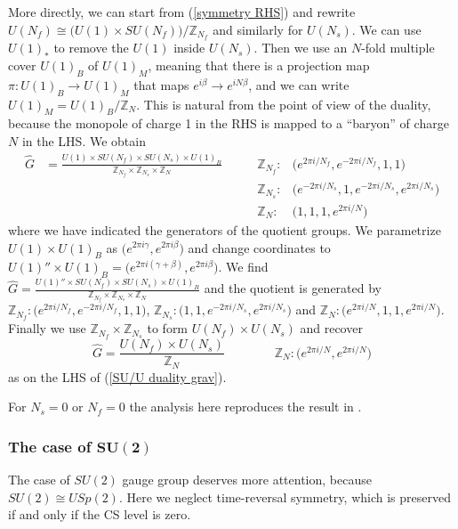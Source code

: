 \documentclass[a4paper, 12pt]{article}
\newcommand{\wh}{\widehat}
\newcommand{\matht}[1]{\ensuremath{\boldsymbol{#1}}}
\numberwithin{equation}{section}
\newcommand{\be}{\begin{equation}} \newcommand{\ee}{\end{equation}}
\newcommand{\bea}{\begin{equation} \begin{aligned}} \newcommand{\eea}{\end{aligned} \end{equation}}
\newcommand{\bZ}{\mathbb{Z}}
\begin{document}
More directly, we can start from (\ref{symmetry RHS}) and rewrite $U(N_f) \cong \big( U(1) \times SU(N_f) \big)/\bZ_{N_f}$ and similarly for $U(N_s)$. We can use $U(1)_*$ to remove the $U(1)$ inside $U(N_s)$. Then we use an $N$-fold multiple cover $U(1)_B$ of $U(1)_M$, meaning that there is a projection map $\pi:U(1)_B \to U(1)_M$ that maps $e^{i\beta} \to e^{iN\beta}$, and we can write $U(1)_M = U(1)_B/\bZ_N$. This is natural from the point of view of the duality, because the monopole of charge 1 in the RHS is mapped to a ``baryon'' of charge $N$ in the LHS. We obtain
\bea
\wh G &= \frac{U(1) \times SU(N_f) \times SU(N_s) \times U(1)_B}{\bZ_{N_f} \times \bZ_{N_s} \times \bZ_N} \qquad & \bZ_{N_f}: & \big( e^{2\pi i /N_f}, e^{-2\pi i /N_f}, 1, 1 \big) \\
&& \bZ_{N_s}: & \big( e^{-2\pi i /N_s}, 1,e^{-2\pi i / N_s}, e^{2\pi i /N_s} \big) \\
&& \bZ_N : & \big( 1,1,1,e^{2\pi i /N} \big)
\eea
where we have indicated the generators of the quotient groups. We parametrize $U(1) \times U(1)_B$ as $\big( e^{2\pi i \gamma}, e^{2\pi i \beta} \big)$ and change coordinates to $U(1)'' \times U(1)_B = \big( e^{2\pi i (\gamma+\beta)}, e^{2\pi i \beta} \big)$. We find \mbox{$\wh G = \frac{U(1)'' \times SU(N_f) \times SU(N_s) \times U(1)_B}{\bZ_{N_f} \times \bZ_{N_s} \times \bZ_N}$} and the quotient is generated by \mbox{$\bZ_{N_f}: \big( e^{2\pi i /N_f}, e^{-2\pi i /N_f}, 1, 1 \big)$}, \mbox{$\bZ_{N_s}: \big( 1, 1,e^{-2\pi i / N_s}, e^{2\pi i /N_s} \big)$} and \mbox{$\bZ_N : \big( e^{2\pi i /N} ,1,1,e^{2\pi i /N} \big)$}. Finally we use $\bZ_{N_f} \times \bZ_{N_s}$ to form $U(N_f) \times U(N_s)$ and recover
\be
\wh G = \frac{U(N_f) \times U(N_s)}{\bZ_N} \qquad\qquad \bZ_N : \big( e^{2\pi i /N}, e^{2\pi i /N} \big)
\ee
as on the LHS of (\ref{SU/U duality grav}).

For $N_s=0$ or $N_f=0$ the analysis here reproduces the result in \cite{Benini:2017dus}.









\subsubsection[The case of $SU(2)$]{The case of \matht{SU(2)}}
\label{sec: case of SU(2)}

The case of $SU(2)$ gauge group deserves more attention, because $SU(2) \cong USp(2)$. Here we neglect time-reversal symmetry, which is preserved if and only if the CS level is zero.
\end{document}
